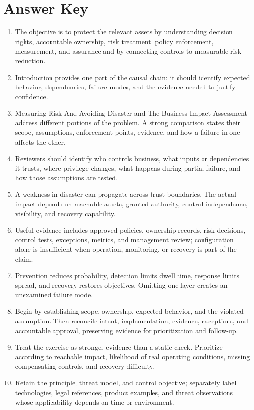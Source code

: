\documentclass[11pt]{article}
\begin{document}
\section*{Answer Key}
\begin{enumerate}
\item The objective is to protect the relevant assets by understanding decision rights, accountable ownership, risk treatment, policy enforcement, measurement, and assurance and by connecting controls to measurable risk reduction.
\item Introduction provides one part of the causal chain: it should identify expected behavior, dependencies, failure modes, and the evidence needed to justify confidence.
\item Measuring Risk And Avoiding Disaster and The Business Impact Assessment address different portions of the problem. A strong comparison states their scope, assumptions, enforcement points, evidence, and how a failure in one affects the other.
\item Reviewers should identify who controls business, what inputs or dependencies it trusts, where privilege changes, what happens during partial failure, and how those assumptions are tested.
\item A weakness in disaster can propagate across trust boundaries. The actual impact depends on reachable assets, granted authority, control independence, visibility, and recovery capability.
\item Useful evidence includes approved policies, ownership records, risk decisions, control tests, exceptions, metrics, and management review; configuration alone is insufficient when operation, monitoring, or recovery is part of the claim.
\item Prevention reduces probability, detection limits dwell time, response limits spread, and recovery restores objectives. Omitting one layer creates an unexamined failure mode.
\item Begin by establishing scope, ownership, expected behavior, and the violated assumption. Then reconcile intent, implementation, evidence, exceptions, and accountable approval, preserving evidence for prioritization and follow-up.
\item Treat the exercise as stronger evidence than a static check. Prioritize according to reachable impact, likelihood of real operating conditions, missing compensating controls, and recovery difficulty.
\item Retain the principle, threat model, and control objective; separately label technologies, legal references, product examples, and threat observations whose applicability depends on time or environment.
\end{enumerate}
\end{document}
